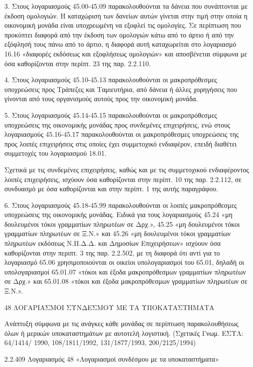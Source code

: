 \documentclass[A4,10pt,greek]{book}
\begin{document}
3. Στους λογαριασμούς 45.00-45.09 παρακολουθούνται τα δάνεια που συνάπτονται με έκδοση ομολογιών. Η καταχώριση των δανείων αυτών γίνεται στην τιμή στην οποία η οικονομική μονάδα είναι υποχρεωμένη να εξοφλεί τις ομολογίες. Σε περίπτωση που προκύπτει διαφορά από την έκδοση των ομολογιών κάτω από το άρτιο ή από την εξόφλησή τους πάνω από το άρτιο, η διαφορά αυτή καταχωρείται στο λογαριασμό 16.16 «διαφορές εκδόσεως και εξοφλήσεως ομολογιών» και αποσβένεται σύμφωνα με όσα καθορίζονται στην περίπτ. 23 της παρ. 2.2.110.

4. Στους λογαριασμούς 45.10-45.13 παρακολουθούνται οι μακροπρόθεσμες υποχρεώσεις προς Τράπεζες και Ταμιευτήρια, από δάνεια ή άλλες χορηγήσεις που γίνονται από τους οργανισμούς αυτούς προς την οικονομική μονάδα.

5. Στους λογαριασμούς 45.14-45.15 παρακολουθούνται οι μακροπρόθεσμες υποχρεώσεις της οικονομικής μονάδας προς συνδεμένες επιχειρήσεις, ενώ στους λογαριασμούς 45.16-45.17 παρακολουθούνται οι μακροπρόθεσμες υποχρεώσεις της προς λοιπές επιχειρήσεις στις οποίες έχει συμμετοχικό ενδιαφέρον, επειδή διαθέτει συμμετοχές του λογαριασμού 18.01.

Σχετικά με τις συνδεμένες επιχειρήσεις, καθώς και με τις συμμετοχικού ενδιαφέροντος λοιπές επιχειρήσεις, ισχύουν όσα καθορίζονται στην περίπτ. 10 της παρ. 2.2.112, σε συνδυασμό με όσα καθορίζονται και στην περίπτ. 1 της αυτής παραγράφου.

6. Στους λογαριασμούς 45.18-45.99 παρακολουθούνται οι λοιπές μακροπρόθεσμες υποχρεώσεις της οικονομικής μονάδας. Ειδικά για τους λογαριασμούς 45.24 «μη δουλευμένοι τόκοι γραμματίων πληρωτέων σε Δρχ.», 45.25 «μη δουλευμένοι τόκοι γραμματίων πληρωτέων σε Ξ.Ν.» και 45.26 «μη δουλευμένοι τόκοι γραμματίων πληρωτέων εκδόσεως Ν.Π.Δ.Δ. και Δημοσίων Επιχειρήσεων» ισχύουν όσα καθορίζονται στην περιπτ. 3 της παρ. 2.2.502, με τη διαφορά ότι αντί για το λογαριασμό 65.06 χρησιμοποιούνται οι οικείοι υπολογαριασμοί του 65.01, δηλαδή οι υπολογαριασμοί 65.01.07 «τόκοι και έξοδα μακροπρόθεσμων γραμματίων πληρωτέων σε Δρχ.» και 65.01.08 «τόκοι και έξοδα μακροπρόθεσμων γραμματίων πληρωτέων σε Ξ.Ν.».

 48   ΛΟΓΑΡΙΑΣΜΟΙ ΣΥΝΔΕΣΜΟΥ ΜΕ ΤΑ ΥΠΟΚΑΤΑΣΤΗΜΑΤΑ

       Ανάπτυξη σύμφωνα με τις ανάγκες κάθε μονάδας σε περίπτωση
       παρακολουθήσεως όλων ή μερικών υποκαταστημάτων με αυτοτελή
       λογιστική. (Σχετικές Γνωμ. ΕΣΥΛ: 64/1414/ 1990, 108/1811/1992,
       131/1877/1993, 200/2125/1994)

2.2.409 Λογαριασμός 48 «Λογαριασμοί συνδέσμου με τα υποκαταστήματα»
\end{document}
